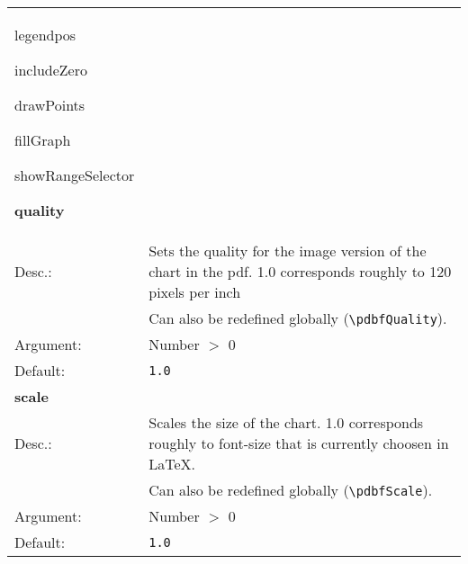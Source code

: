 \documentclass[11pt]{scrartcl}
\begin{document}
\begin{tabular}{ll}


legendpos

includeZero

drawPoints

fillGraph

showRangeSelector

\textbf{quality} \\
Desc.:	&	Sets the quality for the image version of the chart in the pdf. 1.0 corresponds roughly to 120 pixels per inch \\
& Can also be redefined globally (\verb|\pdbfQuality|). \\
Argument:	&Number $>$ 0 \\
Default:&	\verb|1.0| \\[4pt]

\textbf{scale} \\
Desc.:	&	Scales the size of the chart. 1.0 corresponds roughly to font-size that is currently choosen in \LaTeX. \\
& Can also be redefined globally (\verb|\pdbfScale|). \\
Argument:	&Number $>$ 0 \\
Default:&	\verb|1.0| \\[4pt]

\end{tabular} \\
\end{document}
